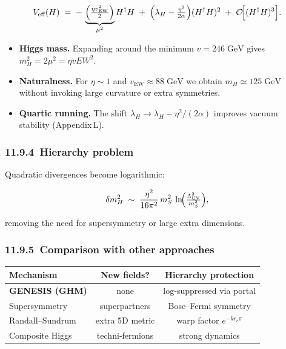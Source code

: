\documentclass{article}
\newcommand{\vEW}{\ensuremath{v_{\mathrm{EW}}}}
\begin{document}
\begin{equation}
  V_{\text{eff}}(H)
  \;=\;
  -\,\underbrace{\Bigl(\tfrac{\eta \vEW^2}{2}\Bigr)}_{\mu^{2}}
      H^{\dagger}H
  \;+\;
  \Bigl(\lambda_{H}-\tfrac{\eta^{2}}{2\alpha}\Bigr)
      (H^{\dagger}H)^{2}
  \;+\;
  \mathcal O\!\Bigl[(H^{\dagger}H)^{3}\Bigr].
  \label{eq:Veff}
\end{equation}

\begin{itemize}
\item \textbf{Higgs mass.}
      Expanding around the minimum $v=246\;\mathrm{GeV}$ gives
      \(
        m_{H}^{2}=2\mu^{2}= \eta vEW^2.
      \)
\item \textbf{Naturalness.}
      For $\eta\!\sim\!1$ and $v_{\text{EW}}\!\approx\!88\;\mathrm{GeV}$
      we obtain $m_{H}\simeq125\;\mathrm{GeV}$ without invoking large curvature  
      or extra symmetries.

\item \textbf{Quartic running.}
      The shift
      $\lambda_{H}\!\to\!\lambda_{H}-\eta^{2}/(2\alpha)$
      improves vacuum stability (Appendix L).
\end{itemize}

\subsubsection*{11.9.4 Hierarchy problem}

Quadratic divergences become logarithmic:

\begin{equation}\label{eq:auto122}
\delta m_{H}^{2}\;\sim\;
  \frac{\eta^{2}}{16\pi^{2}}\,
  m_{S}^{2}\,
  \ln\!\Bigl(\tfrac{\Lambda_{\text{UV}}^{2}}{m_{S}^{2}}\Bigr),
\end{equation}

removing the need for supersymmetry or large extra dimensions.

\subsubsection*{11.9.5 Comparison with other approaches}

\begin{center}
\begin{tabular}{lcc}
\toprule
Mechanism                & New fields? & Hierarchy protection \\ \midrule
\textbf{GENESIS (GHM)}   & none        & log‑suppressed via portal \\ 
Supersymmetry            & superpartners & Bose–Fermi symmetry \\ 
Randall–Sundrum          & extra 5D metric & warp factor $e^{-kr_c\pi}$ \\ 
Composite Higgs          & techni‑fermions & strong dynamics \\ 
\bottomrule
\end{tabular}
\end{center}
\end{document}
